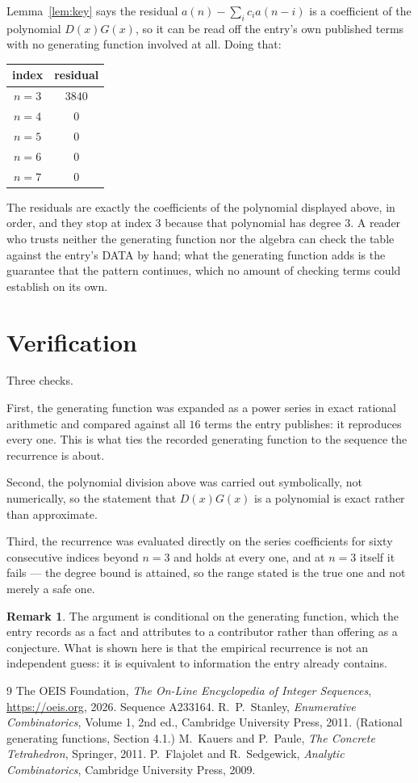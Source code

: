 \documentclass[11pt,a4paper]{article}
\theoremstyle{plain}
\theoremstyle{definition}
\newtheorem{remark}[theorem]{Remark}
\begin{document}
Lemma~\ref{lem:key} says the residual $a(n)-\sum_ic_ia(n-i)$ is a coefficient of the
polynomial $D(x)G(x)$, so it can be read off the entry's own published terms with no
generating function involved at all. Doing that:
\begin{center}
\begin{tabular}{cc}
index & residual \\ \hline
$n=3$ & $3840$ \\
$n=4$ & $0$ \\
$n=5$ & $0$ \\
$n=6$ & $0$ \\
$n=7$ & $0$
\end{tabular}
\end{center}
The residuals are exactly the coefficients of the polynomial displayed above, in order, and
they stop at index $3$ because that polynomial has degree $3$. A reader who trusts
neither the generating function nor the algebra can check the table against the entry's DATA
by hand; what the generating function adds is the guarantee that the pattern continues, which
no amount of checking terms could establish on its own.

\section{Verification}

Three checks.

First, the generating function was expanded as a power series in exact rational arithmetic and
compared against all $16$ terms the entry publishes: it reproduces every one. This is
what ties the recorded generating function to the sequence the recurrence is about.

Second, the polynomial division above was carried out symbolically, not numerically, so the
statement that $D(x)G(x)$ is a polynomial is exact rather than approximate.

Third, the recurrence was evaluated directly on the series coefficients for sixty consecutive
indices beyond $n=3$ and holds at every one, and at $n=3$ itself it fails --- the
degree bound is attained, so the range stated is the true one and not merely a safe one.

\begin{remark}
The argument is conditional on the generating function, which the entry records as a fact and
attributes to a contributor rather than offering as a conjecture. What is shown here is that
the empirical recurrence is not an independent guess: it is equivalent to information the
entry already contains.
\end{remark}

\begin{thebibliography}{9}
 The OEIS Foundation, \emph{The On-Line Encyclopedia of Integer
Sequences}, \url{https://oeis.org}, 2026. Sequence A233164.
 R.~P.~Stanley, \emph{Enumerative Combinatorics}, Volume 1, 2nd ed.,
Cambridge University Press, 2011. (Rational generating functions, Section 4.1.)
 M.~Kauers and P.~Paule, \emph{The Concrete Tetrahedron}, Springer, 2011.
 P.~Flajolet and R.~Sedgewick, \emph{Analytic Combinatorics}, Cambridge
University Press, 2009.
\end{thebibliography}
\end{document}
